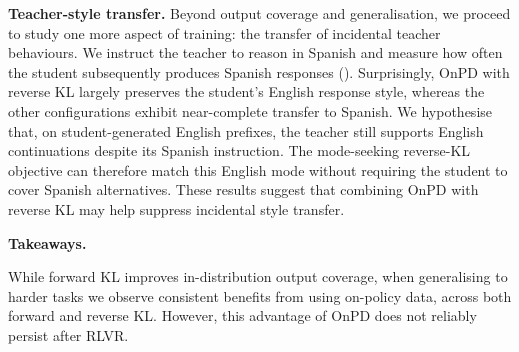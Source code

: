 \documentclass{article} %
\theoremstyle{plain}
\theoremstyle{definition}
\theoremstyle{remark}
\newenvironment{highlight}[1][Takeaways]
{%
\begin{tcolorbox}[
    enhanced,
    breakable,
    frame hidden,
    colback=takeawayblue!5,
    borderline west={2pt}{0pt}{takeawayblue},
    boxsep=0pt,
    left=2.5mm,
    right=2.5mm,
    top=2mm,
    bottom=2mm
]
\noindent
\textcolor{takeawayblue}{%
    \faLightbulb\hspace{0.4em}\textbf{#1.}\hspace{0.5em}%
}\hspace{0.35em}\ignorespaces
}
{%
\unskip
\end{tcolorbox}
}
\begin{document}
\textbf{Teacher-style transfer.}
Beyond output coverage and generalisation, we proceed to study one more aspect of training: the transfer of incidental teacher behaviours. We instruct the teacher to reason in Spanish and measure how often the student subsequently produces Spanish responses (). Surprisingly, OnPD with reverse KL largely preserves the student’s English response style, whereas the other configurations exhibit near-complete transfer to Spanish. We hypothesise that, on student-generated English prefixes, the teacher still supports English continuations despite its Spanish instruction. The mode-seeking reverse-KL objective can therefore match this English mode without requiring the student to cover Spanish alternatives. These results suggest that combining OnPD with reverse KL may help suppress incidental style transfer.

\begin{highlight}
    While forward KL improves in-distribution output coverage, when generalising to harder tasks we observe consistent benefits from using on-policy data, across both forward and reverse KL. However, this advantage of OnPD does not reliably persist after RLVR.
\end{highlight}





\end{document}
